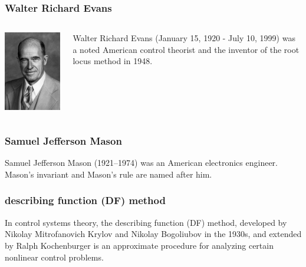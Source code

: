 \documentclass{beamer}
\begin{document}
\begin{frame}
\frametitle{Walter Richard Evans}
\label{sec-2-12}
\begin{columns}
\begin{column}{0.3\textwidth}
\label{sec-2-12-1}

   \includegraphics[width=.9\linewidth]{image/Evans.jpg}
\end{column}
\begin{column}{0.7\textwidth}
\label{sec-2-12-2}


   Walter Richard Evans (January 15, 1920 - July 10, 1999) was a noted American control theorist and the inventor of the root locus method in 1948. 
\end{column}
\end{columns}
\end{frame}
\begin{frame}
\frametitle{Samuel Jefferson Mason}
\label{sec-2-13}

   Samuel Jefferson Mason (1921–1974) was an American electronics engineer. Mason's invariant and Mason's rule are named after him.
\end{frame}
\begin{frame}
\frametitle{describing function (DF) method}
\label{sec-2-14}

   In control systems theory, the describing function (DF) method, developed by Nikolay Mitrofanovich Krylov and Nikolay Bogoliubov in the 1930s, and extended by Ralph Kochenburger is an approximate procedure for analyzing certain nonlinear control problems.
\end{frame}
\end{document}
